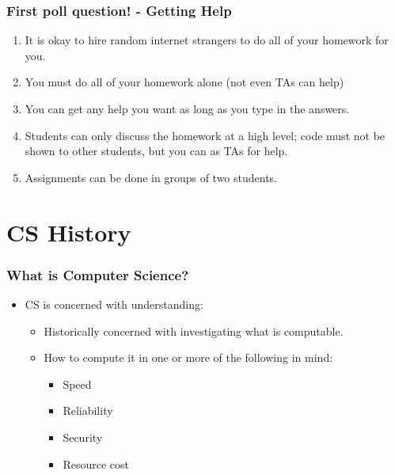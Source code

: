 \documentclass{beamer}
\begin{document}
\begin{frame}
  \frametitle{First poll question! - Getting Help}
  \begin{enumerate}
    \item It is okay to hire random internet strangers to do all of your homework for you.
    \item You must do all of your homework alone (not even TAs can help)
    \item You can get any help you want as long as you type in the answers.
    \item Students can only discuss the homework at a high level; code must not be shown to other students, but you can as TAs for help.
    \item Assignments can be done in groups of two students.
  \end{enumerate}
\end{frame}

\section{CS History}

%
%
\begin{frame}
  \frametitle{What is Computer Science?}
  \begin{itemize}
    \item CS is concerned with understanding:
      \begin{itemize}
      \item Historically concerned with investigating what is computable.
      \item How to compute it in one or more of the following in mind:
        \begin{itemize}
        \item Speed
        \item Reliability
        \item Security 
        \item Resource cost
      \end{itemize}
  \end{itemize}
  \end{itemize}
\end{frame}
\end{document}
